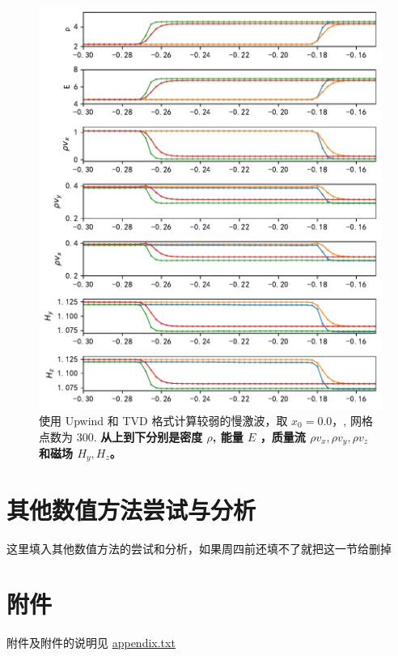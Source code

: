 \documentclass[10.5pt
]{article}
\begin{document}
\begin{figure}[htpb]
	\centering
	\includegraphics[width=\textwidth]{figures/case1_slow_upwind_TVD.pdf}
	\caption{使用 Upwind 和 TVD 格式计算较弱的慢激波，取 \(x_0 = 0.0，\), 网格点数为 300. \textbf{从上到下分别是密度 $\rho$, 能量 $E$ ，质量流 $\rho v_x, \rho v_y, \rho v_z$ 和磁场 $H_y, H_z$。}
	}%
	\label{fig:upwind_tvd_3}
\end{figure}

\section{其他数值方法尝试与分析}
这里填入其他数值方法的尝试和分析，如果周四前还填不了就把这一节给删掉

\section{附件}
附件及附件的说明见 \href{./appendix.txt}{appendix.txt} 


% 
%


\end{document}

